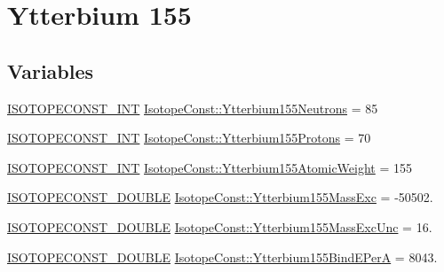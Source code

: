 \hypertarget{group___isotope_const-_ytterbium-_yb155}{}\section{Ytterbium 155}
\label{group___isotope_const-_ytterbium-_yb155}
\subsection*{Variables}
\begin{DoxyCompactItemize}
\item 
\mbox{\hyperlink{group___isotope_const-_macros_ga5f18360b3e99483a35c32d789e62621c}{I\+S\+O\+T\+O\+P\+E\+C\+O\+N\+S\+T\+\_\+\+I\+NT}} \mbox{\hyperlink{group___isotope_const-_ytterbium-_yb155_ga6485533ae314549a63e41fe8ad2cdcfb}{Isotope\+Const\+::\+Ytterbium155\+Neutrons}} = 85
\item 
\mbox{\hyperlink{group___isotope_const-_macros_ga5f18360b3e99483a35c32d789e62621c}{I\+S\+O\+T\+O\+P\+E\+C\+O\+N\+S\+T\+\_\+\+I\+NT}} \mbox{\hyperlink{group___isotope_const-_ytterbium-_yb155_gaf59d3cc884b72c35e4ebee23d4e981f5}{Isotope\+Const\+::\+Ytterbium155\+Protons}} = 70
\item 
\mbox{\hyperlink{group___isotope_const-_macros_ga5f18360b3e99483a35c32d789e62621c}{I\+S\+O\+T\+O\+P\+E\+C\+O\+N\+S\+T\+\_\+\+I\+NT}} \mbox{\hyperlink{group___isotope_const-_ytterbium-_yb155_gabac3cfa6c77cba1a47b560cc68e566d2}{Isotope\+Const\+::\+Ytterbium155\+Atomic\+Weight}} = 155
\item 
\mbox{\hyperlink{group___isotope_const-_macros_ga8f45a7272ce02c0b4c65c44636ed719a}{I\+S\+O\+T\+O\+P\+E\+C\+O\+N\+S\+T\+\_\+\+D\+O\+U\+B\+LE}} \mbox{\hyperlink{group___isotope_const-_ytterbium-_yb155_ga106cdbec559ccccab8c0caa6a1f73984}{Isotope\+Const\+::\+Ytterbium155\+Mass\+Exc}} = -\/50502.
\item 
\mbox{\hyperlink{group___isotope_const-_macros_ga8f45a7272ce02c0b4c65c44636ed719a}{I\+S\+O\+T\+O\+P\+E\+C\+O\+N\+S\+T\+\_\+\+D\+O\+U\+B\+LE}} \mbox{\hyperlink{group___isotope_const-_ytterbium-_yb155_gadea42d36f5ed04cab9cf8ee806658f7f}{Isotope\+Const\+::\+Ytterbium155\+Mass\+Exc\+Unc}} = 16.
\item 
\mbox{\hyperlink{group___isotope_const-_macros_ga8f45a7272ce02c0b4c65c44636ed719a}{I\+S\+O\+T\+O\+P\+E\+C\+O\+N\+S\+T\+\_\+\+D\+O\+U\+B\+LE}} \mbox{\hyperlink{group___isotope_const-_ytterbium-_yb155_ga1804a3ae4fd5031c80457cd8e15dcd20}{Isotope\+Const\+::\+Ytterbium155\+Bind\+E\+PerA}} = 8043.
\item 

\end{DoxyCompactItemize}
